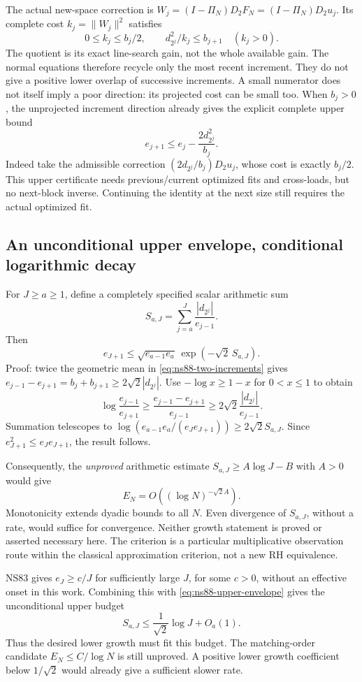 The actual new-space correction is $W_j=(I-\Pi_N)D_2F_N=(I-\Pi_N)D_2u_j$.
Its complete cost $k_j=\|W_j\|^2$ satisfies
\[
 0\le k_j\le b_j/2,
 \qquad d_{2^j}^2/k_j\le b_{j+1}\quad(k_j>0).
\]
The quotient is its exact line-search gain, not the whole available gain.
The normal equations therefore recycle only the most recent increment.
They do not give a positive lower overlap of successive increments.
A small numerator does not itself imply a poor direction: its projected
cost can be small too. When $b_j>0$, the unprojected increment direction
already gives the explicit complete upper bound
\[
 e_{j+1}\le e_j-\frac{2d_{2^j}^2}{b_j}.
\]
Indeed take the admissible correction $(2d_{2^j}/b_j)D_2u_j$, whose cost
is exactly $b_j/2$. This upper certificate needs previous/current optimized
fits and cross-loads, but no next-block inverse. Continuing the identity
at the next size still requires the actual optimized fit.

\subsection{An unconditional upper envelope, conditional logarithmic decay}
For $J\ge a\ge1$, define a completely specified scalar arithmetic sum
\[
 S_{a,J}=\sum_{j=a}^J\frac{|d_{2^j}|}{e_{j-1}}.
\]
Then
\begin{equation}
 e_{J+1}\le\sqrt{e_{a-1}e_a}\,
                \exp(-\sqrt2\,S_{a,J}).
 \label{eq:ns88-upper-envelope}
\end{equation}
Proof: twice the geometric mean in \eqref{eq:ns88-two-increments} gives
$e_{j-1}-e_{j+1}=b_j+b_{j+1}\ge2\sqrt2|d_{2^j}|$.
Use $-\log x\ge1-x$ for $0<x\le1$ to obtain
\[
 \log\frac{e_{j-1}}{e_{j+1}}
 \ge\frac{e_{j-1}-e_{j+1}}{e_{j-1}}
 \ge2\sqrt2\frac{|d_{2^j}|}{e_{j-1}}.
\]
Summation telescopes to
$\log(e_{a-1}e_a/(e_Je_{J+1}))\ge2\sqrt2 S_{a,J}$.
Since $e_{J+1}^2\le e_Je_{J+1}$, the result follows.

Consequently, the \emph{unproved} arithmetic estimate
$S_{a,J}\ge A\log J-B$ with $A>0$ would give
\[
 E_N=O((\log N)^{-\sqrt2 A}).
\]
Monotonicity extends dyadic bounds to all $N$. Even divergence of $S_{a,J}$,
without a rate, would suffice for convergence. Neither growth statement is
proved or asserted necessary here. The criterion is a particular
multiplicative observation route within the classical approximation criterion,
not a new RH equivalence.

NS83 gives $e_J\ge c/J$ for sufficiently large $J$, for some $c>0$,
without an effective onset in this work. Combining this with
\eqref{eq:ns88-upper-envelope} gives the unconditional upper budget
\[
 S_{a,J}\le\frac1{\sqrt2}\log J+O_a(1).
\]
Thus the desired lower growth must fit this budget. The matching-order
candidate $E_N\le C/\log N$ is still unproved. A positive lower growth
coefficient below $1/\sqrt2$ would already give a sufficient slower rate.

